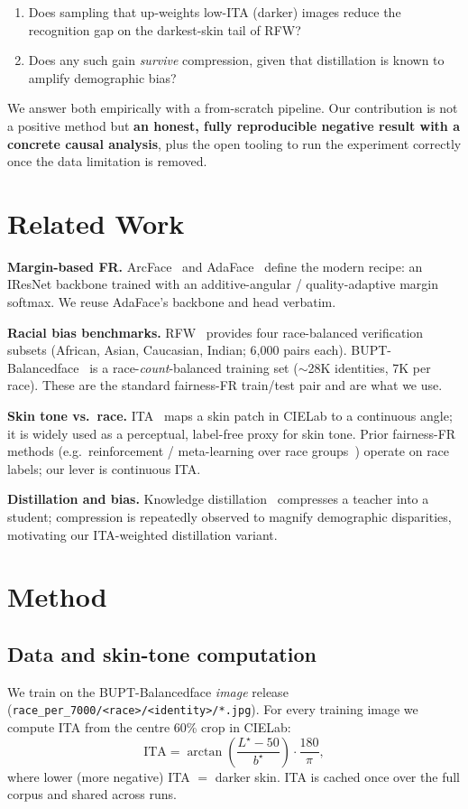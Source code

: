 \documentclass[10pt,twocolumn]{article}
\begin{document}
\begin{enumerate}\itemsep2pt
\item Does sampling that up-weights low-ITA (darker) images reduce the
recognition gap on the darkest-skin tail of RFW?
\item Does any such gain \emph{survive} compression, given that distillation is
known to amplify demographic bias?
\end{enumerate}

We answer both empirically with a from-scratch pipeline. Our contribution is not
a positive method but \textbf{an honest, fully reproducible negative result with
a concrete causal analysis}, plus the open tooling to run the experiment
correctly once the data limitation is removed.

\section{Related Work}
\textbf{Margin-based FR.} ArcFace~\cite{arcface} and AdaFace~\cite{adaface}
define the modern recipe: an IResNet backbone trained with an additive-angular /
quality-adaptive margin softmax. We reuse AdaFace's backbone and head verbatim.

\textbf{Racial bias benchmarks.} RFW~\cite{rfw} provides four race-balanced
verification subsets (African, Asian, Caucasian, Indian; 6{,}000 pairs each).
BUPT-Balancedface~\cite{bupt} is a race-\emph{count}-balanced training set
(\(\sim\)28K identities, 7K per race). These are the standard fairness-FR
train/test pair and are what we use.

\textbf{Skin tone vs.\ race.} ITA~\cite{ita} maps a skin patch in CIELab to a
continuous angle; it is widely used as a perceptual, label-free proxy for skin
tone. Prior fairness-FR methods (e.g.\ reinforcement / meta-learning over race
groups~\cite{bupt}) operate on race labels; our lever is continuous ITA.

\textbf{Distillation and bias.} Knowledge distillation~\cite{kd} compresses a
teacher into a student; compression is repeatedly observed to magnify
demographic disparities, motivating our ITA-weighted distillation variant.

\section{Method}
\subsection{Data and skin-tone computation}
We train on the BUPT-Balancedface \emph{image} release
(\texttt{race\_per\_7000/<race>/<identity>/*.jpg}). For every training image we
compute ITA from the centre 60\% crop in CIELab:
\begin{equation}
\mathrm{ITA} = \arctan\!\left(\frac{L^\star - 50}{b^\star}\right)\cdot \frac{180}{\pi},
\end{equation}
where lower (more negative) ITA $=$ darker skin. ITA is cached once over the
full corpus and shared across runs.
\end{document}
